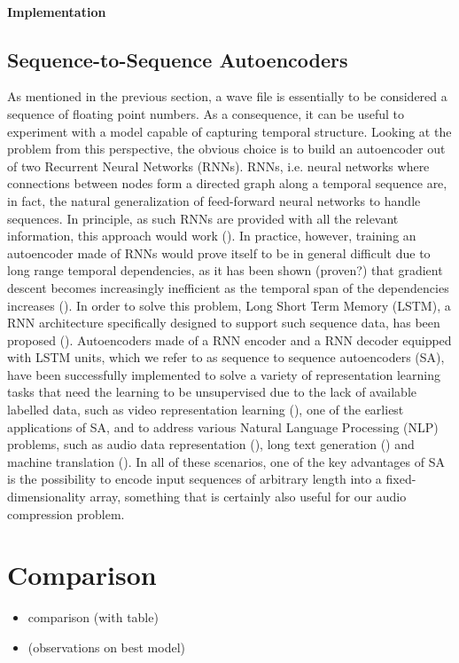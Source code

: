 \documentclass[11pt]{article}
\begin{document}
\paragraph{Implementation}
\subsection{Sequence-to-Sequence Autoencoders}
As mentioned in the previous section, a wave file is essentially to be considered a sequence of floating point numbers. As a consequence, it can be useful to experiment with a model capable of capturing temporal structure. Looking at the problem from this perspective, the obvious choice is to build an autoencoder out of two Recurrent Neural Networks (RNNs). RNNs, i.e. neural networks where connections between nodes form a directed graph along a temporal sequence are, in fact, the natural generalization of feed-forward neural networks to handle sequences. In principle, as such RNNs are provided with all the relevant information, this approach would work (\cite{Sutskever.2014}). In practice, however, training an autoencoder made of RNNs would prove itself to be in general difficult due to long range temporal dependencies, as it has been shown (proven?) that gradient descent becomes increasingly inefficient as the temporal span of the dependencies increases (\cite{Bengio.1994}). In order to solve this problem, Long Short Term Memory (LSTM), a RNN architecture specifically designed to support such sequence data, has been proposed (\cite{Hochreiter.1997}). Autoencoders made of a RNN encoder and a RNN decoder equipped with LSTM units, which we refer to as sequence to sequence autoencoders (SA), have been successfully implemented to solve a variety of representation learning tasks that need the learning to be unsupervised due to the lack of available labelled data, such as video representation learning (\cite{Srivastava.2015}), one of the earliest applications of SA, and to address various Natural Language Processing (NLP) problems, such as audio data representation (\cite{Yu.2016}), long text generation (\cite{Jiwei.2015}) and machine translation (\cite{Sutskever.2014}). In all of these scenarios, one of the key advantages of SA is the possibility to encode input sequences of arbitrary length into a fixed-dimensionality array, something that is certainly also useful for our audio compression problem.
\section{Comparison}
\begin{itemize}
    \item comparison (with table)
    \item (observations on best model)
\end{itemize}
\end{document}
